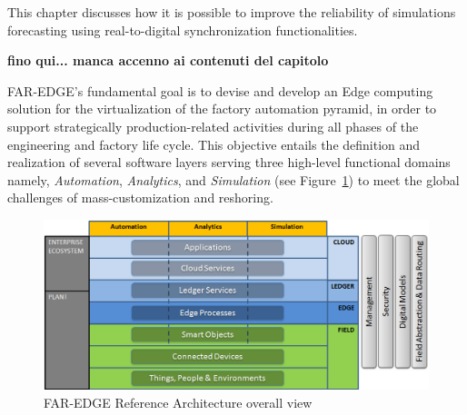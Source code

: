 This chapter discusses how it is possible to improve the reliability of simulations forecasting using real-to-digital synchronization functionalities. 

\textbf{fino qui... manca accenno ai contenuti del capitolo}




FAR-EDGE’s fundamental goal is to devise and develop an Edge computing solution for the virtualization of the factory automation pyramid, in order to support strategically production-related activities during all phases of the engineering and factory life cycle. This objective entails the definition and realization of several software layers serving three high-level functional domains namely, \textit{Automation}, \textit{Analytics}, and \textit{Simulation} (see Figure~\ref{fig:architecture}) to meet the global challenges of mass-customization and reshoring.

\begin{figure}
	\centering
	\includegraphics[width=\linewidth]{images/Far-edge.png}
	\caption{FAR-EDGE Reference Architecture overall view}
	\label{fig:architecture}
\end{figure}

